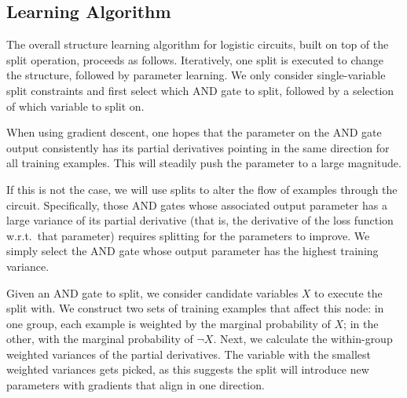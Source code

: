 \documentclass[letterpaper]{article} %
\begin{document}
\subsection{Learning Algorithm}
The overall structure learning algorithm for logistic circuits, built on top of the split operation, proceeds as follows. Iteratively, one split is executed to change the structure, followed by parameter learning.
We only consider single-variable split constraints and first select which AND gate to split, followed by a selection of which variable to split on.

When using gradient descent, one hopes that the parameter on the AND gate output consistently has its partial derivatives pointing in the same direction for all training examples. This will steadily push the parameter to a large magnitude.

If this is not the case, we will use splits to alter the flow of examples through the circuit.
Specifically, those AND gates whose associated output parameter has a large variance of its partial derivative (that is, the derivative of the loss function w.r.t.~that parameter) requires splitting for the parameters to improve.  We simply select the AND gate whose output parameter has the highest training variance.

Given an AND gate to split, we consider candidate variables $X$ to execute the split with. We construct two sets of training examples that affect this node: in one group, each example is weighted by the marginal probability of $X$; in the other,
with the marginal probability of $\neg X$.
Next, we calculate the within-group weighted variances of the partial derivatives.
The variable with the smallest weighted variances gets picked, as this suggests the split will introduce new parameters with gradients that align in one direction.
\end{document}
